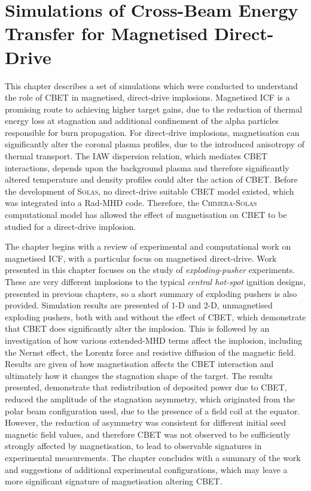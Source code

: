 \chapter{Simulations of Cross-Beam Energy Transfer for Magnetised Direct-Drive}

This chapter describes a set of simulations which were conducted to understand the role of \ac{CBET} in magnetised, direct-drive implosions.
Magnetised \ac{ICF} is a promising route to achieving higher target gains, due to the reduction of thermal energy loss at stagnation and additional confinement of the alpha particles responsible for burn propagation.
For direct-drive implosions, magnetisation can significantly alter the coronal plasma profiles, due to the introduced anisotropy of thermal transport.
The \ac{IAW} dispersion relation, which mediates \ac{CBET} interactions, depends upon the background plasma and therefore significantly altered temperature and density profiles could alter the action of \ac{CBET}.
Before the development of \textsc{Solas}, no direct-drive suitable \ac{CBET} model existed, which was integrated into a \ac{Rad-MHD} code.
Therefore, the \textsc{Chimera}-\textsc{Solas} computational model has allowed the effect of magnetisation on \ac{CBET} to be studied for a direct-drive implosion.

The chapter begins with a review of experimental and computational work on magnetised \ac{ICF}, with a particular focus on magnetised direct-drive.
Work presented in this chapter focuses on the study of \textit{exploding-pusher} experiments.
These are very different implosions to the typical \textit{central hot-spot} ignition designs, presented in previous chapters, so a short summary of exploding pushers is also provided.
Simulation results are presented of 1-D and 2-D, unmagnetised exploding pushers, both with and without the effect of \ac{CBET}, which demonstrate that \ac{CBET} does significantly alter the implosion.
This is followed by an investigation of how various extended-\ac{MHD} terms affect the implosion, including the Nernst effect, the Lorentz force and resistive diffusion of the magnetic field.
Results are given of how magnetisation affects the \ac{CBET} interaction and ultimately how it changes the stagnation shape of the target.
The results presented, demonstrate that redistribution of deposited power due to \ac{CBET}, reduced the amplitude of the stagnation asymmetry, which originated from the polar beam configuration used, due to the presence of a field coil at the equator.
However, the reduction of asymmetry was consistent for different initial seed magnetic field values, and therefore \ac{CBET} was not observed to be sufficiently strongly affected by magnetisation, to lead to observable signatures in experimental measurements.
The chapter concludes with a summary of the work and suggestions of additional experimental configurations, which may leave a more significant signature of magnetisation altering \ac{CBET}.

